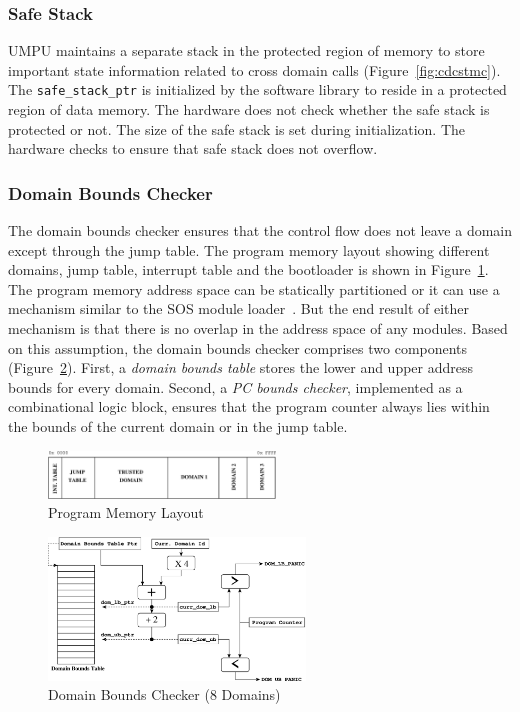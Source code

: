 \subsubsection{Safe Stack}
\label{sec:umpuss}
%
UMPU maintains a separate stack in the protected region of memory to
store important state information related to cross domain calls
(Figure~\ref{fig:cdcstmc}).
%
The \texttt{safe\_stack\_ptr} is initialized by the software library
to reside in a protected region of data memory.
%
The hardware does not check whether the safe stack is protected or not.
%
The size of the safe stack is set during initialization.
%
The hardware checks to ensure that safe stack does not overflow.
%
\subsubsection{Domain Bounds Checker}
\label{sec:dombndschecker}
%
The domain bounds checker ensures that the control flow does not leave
a domain except through the jump table.
%
The program memory layout showing different domains, jump table,
interrupt table and the bootloader is shown in
Figure~\ref{fig:progmemlayout}.
%
The program memory address space can be statically partitioned
or it can use a mechanism similar to the SOS module
loader~\cite{ram05sos}.
%
But the end result of either mechanism is that there is no overlap in
the address space of any modules.
%
Based on this assumption, the domain bounds checker comprises two
components (Figure~\ref{fig:dombndscheck}).
%
First, a \emph{domain bounds table} stores the lower and upper
address bounds for every domain.
%
Second, a \emph{PC bounds checker}, implemented as a combinational
logic block, ensures that the program counter always lies within the
bounds of the current domain or in the jump table.
%
\begin{figure}[htbp]
   \centering
   \includegraphics[height=0.5in,
   keepaspectratio=true]{figures/progmemlayout.eps} 
   \caption{Program Memory Layout}
   \label{fig:progmemlayout}
\end{figure}
\begin{figure}[htbp]
   \centering
   \includegraphics[height=1.5in,
   keepaspectratio=true]{figures/domboundschecker.eps} 
   \caption{Domain Bounds Checker (8 Domains)}
   \label{fig:dombndscheck}
\end{figure}

